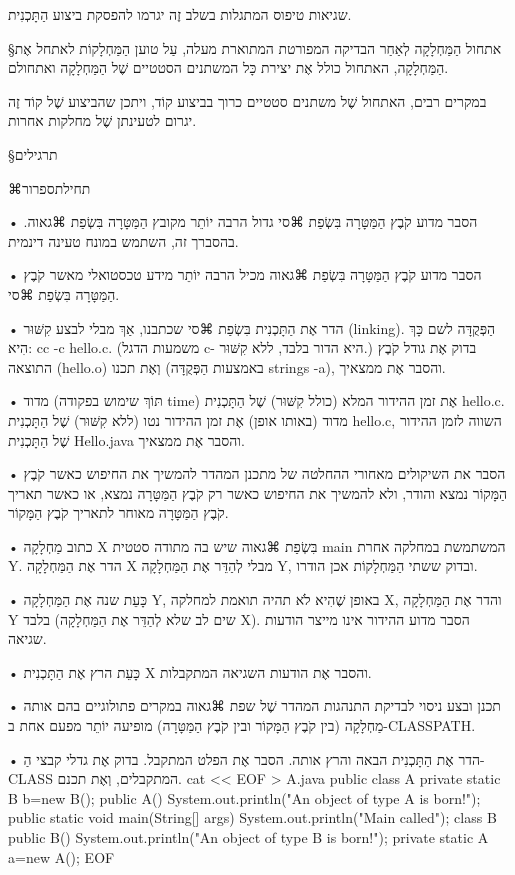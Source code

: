 שגיאות טיפוס המתגלות בשלב זֶה יגרמו להפסקת ביצוע הַתָּכְנִית.

§אתחול הַמַּחְלָקָה
לְאַחַר הבדיקה המפורטת המתוארת מעלה, עַל טוען הַמַּחְלָקוֹת לאתחל אֶת
הַמַּחְלָקָה, האתחול כולל אֶת יצירת כָּל המשתנים הסטטיים שֶׁל הַמַּחְלָקָה
ואתחולם.

במקרים רבים, האתחול שֶׁל משתנים סטטיים כרוך בביצוע קוֹד, ויתכן שהביצוע שֶׁל קוֹד
זֶה יגרום לטעינתן שֶׁל מחלקות אחרות.

§תרגילים

⌘תחילת{ספרור}

• הסבר מדוע קֹבֶץ הַמַּטָּרָה בִּשְׂפַת ⌘סי גדול הרבה יוֹתֵר מקובץ הַמַּטָּרָה
בִּשְׂפַת ⌘גאוה. בהסברך זה, השתמש במונח טעינה דינמית.

• הסבר מדוע קֹבֶץ הַמַּטָּרָה בִּשְׂפַת ⌘גאוה מכיל הרבה יוֹתֵר מידע טכסטואלי
מאשר קֹבֶץ הַמַּטָּרָה בִּשְׂפַת ⌘סי.

• הדר אֶת הַתָּכְנִית בִּשְׂפַת ⌘סי שכתבנו, אַךְ מבלי לבצע קִשּׁוּר (linking).
הַפְּקֻדָּה לשם כָּךְ הִיא: cc -c hello.c. (משמעות הדגל c- היא הדור בלבד, ללא
קִשּׁוּר.) בדוק אֶת גודל קֹבֶץ התוצאה (hello.o) וְאֶת תכנו (באמצעות הַפְּקֻדָּה strings -a),
והסבר אֶת ממצאיך.

• מדוד (תּוֹךְ שימוש בפקודה time) אֶת זמן ההידור המלא (כולל קִשּׁוּר) שֶׁל
הַתָּכְנִית hello.c. מדוד (באותו אופן) אֶת זמן ההידור נטו (ללא קִשּׁוּר) שֶׁל
הַתָּכְנִית hello.c, השווה לזמן ההידור שֶׁל הַתָּכְנִית Hello.java והסבר אֶת
ממצאיך.

• הסבר את השיקולים מאחורי ההחלטה של מתכנן המהדר להמשיך את החיפוש כאשר קֹבֶץ
הַמָּקוֹר נמצא והודר, ולא להמשיך את החיפוש כאשר רק קֹבֶץ הַמַּטָּרָה נמצא, או
כאשר תאריך קֹבֶץ הַמַּטָּרָה מאוחר לתאריך קֹבֶץ הַמָּקוֹר.

• כתוב מַחְלָקָה X בִּשְׂפַת ⌘גאוה שיש בה מתודה סטטית main המשתמשת במחלקה אחרת
Y. הדר אֶת הַמַּחְלָקָה X מבלי לְהַדֵּר אֶת הַמַּחְלָקָה Y, ובדוק ששתי
הַמַּחְלָקוֹת אכן הודרו.

• כָּעֵת שנה אֶת הַמַּחְלָקָה Y, באופן שֶׁהִיא לֹא תהיה תואמת למחלקה X, והדר
אֶת הַמַּחְלָקָה Y בלבד (שים לב שלא לְהַדֵּר אֶת הַמַּחְלָקָה X). הסבר מדוע
ההידור אינו מייצר הודעות שגיאה.

• כָּעֵת הרץ אֶת הַתָּכְנִית X והסבר אֶת הודעות השגיאה המתקבלות.

• תכנן ובצע ניסוי לבדיקת התנהגות המהדר שֶׁל שפת ⌘גאוה במקרים פתולוגיים בהם אותה
מַחְלָקָה (בין קֹבֶץ הַמָּקוֹר ובין קֹבֶץ הַמַּטָּרָה) מופיעה יוֹתֵר מפעם אחת
ב-CLASSPATH.

• הדר אֶת הַתָּכְנִית הבאה והרץ אותה. הסבר אֶת הפלט המתקבל. בדוק אֶת גדלי קבצי
הַ-CLASS המתקבלים, וְאֶת תכנם.
cat << EOF > A.java
public class A {
   private static B b=new B();
   public A() { System.out.println("An object of type A is born!"); }
   public static void main(String[] args) {
     System.out.println("Main called\n");
   }
}
class B {
  public B() { System.out.println("An object of type B is born!"); }
  private static A a=new A();
}
EOF
\END

